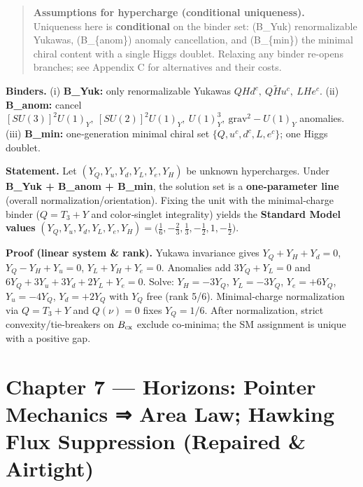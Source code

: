 \documentclass[
]{article}
\numberwithin{equation}{section}
\begin{document}
\begin{quote}
\textbf{Assumptions for hypercharge (conditional uniqueness).}\\
Uniqueness here is \textbf{conditional} on the binder set: (B\_Yuk)
renormalizable Yukawas, (B\_\{\rm anom\}) anomaly cancellation, and
(B\_\{\rm min\}) the minimal chiral content with a single Higgs doublet.
Relaxing any binder re-opens branches; see Appendix C for alternatives
and their costs.
\end{quote}

\textbf{Binders.} (i) \textbf{B\_Yuk:} only renormalizable Yukawas
\(QH d^c,\ Q\tilde H u^c,\ L H e^c\). (ii) \textbf{B\_anom:} cancel
\([SU(3)]^2U(1)_Y,\ [SU(2)]^2U(1)_Y,\ U(1)_Y^3,\ \text{grav}^2\!\!\!-\!U(1)_Y\)
anomalies. (iii) \textbf{B\_min:} one‑generation minimal chiral set
\(\{Q,u^c,d^c,L,e^c\}\); one Higgs doublet.

\textbf{Statement.} Let \((Y_Q,Y_u,Y_d,Y_L,Y_e,Y_H)\) be unknown
hypercharges. Under \textbf{B\_Yuk + B\_anom + B\_min}, the solution set
is a \textbf{one‑parameter line} (overall normalization/orientation).
Fixing the unit with the minimal‑charge binder (\(Q=T_3+Y\) and
color‑singlet integrality) yields the \textbf{Standard Model values}
\(\boxed{(Y_Q,Y_u,Y_d,Y_L,Y_e,Y_H)=\big(\tfrac16,-\tfrac23,\tfrac13,-\tfrac12,1,-\tfrac12\big)}.\)

\textbf{Proof (linear system \& rank).} Yukawa invariance gives
\(Y_Q+Y_H+Y_d=0\), \(Y_Q-Y_H+Y_u=0\), \(Y_L+Y_H+Y_e=0\). Anomalies add
\(3Y_Q+Y_L=0\) and \(6Y_Q+3Y_u+3Y_d+2Y_L+Y_e=0\). Solve: \(Y_H=-3Y_Q\),
\(Y_L=-3Y_Q\), \(Y_e=+6Y_Q\), \(Y_u=-4Y_Q\), \(Y_d=+2Y_Q\) with \(Y_Q\)
free (rank 5/6). Minimal‑charge normalization via \(Q=T_3+Y\) and
\(Q(\nu)=0\) fixes \(Y_Q=1/6\). After normalization, strict
convexity/tie‑breakers on \(B_{\rm cx}\) exclude co‑minima; the SM
assignment is unique with a positive gap.

\hypertarget{chapter-7-horizons-pointer-mechanics-area-law-hawking-flux-suppression-repaired-airtight}{%
\section{Chapter 7 --- Horizons: Pointer Mechanics ⇒ Area Law; Hawking
Flux Suppression (Repaired \&
Airtight)}\label{chapter-7-horizons-pointer-mechanics-area-law-hawking-flux-suppression-repaired-airtight}}
\end{document}
